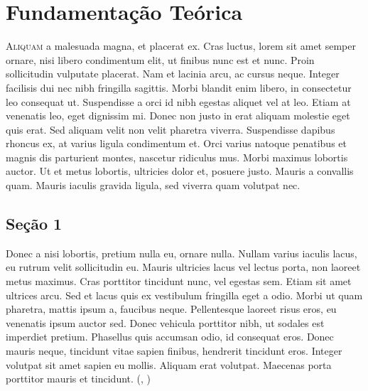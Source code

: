 \chapter{Fundamentação Teórica}
\label{cap:dois}


{\lettrine[loversize=0.25,findent=0.2em,nindent=0em]{A}{liquam} a malesuada magna, et placerat ex. Cras luctus, lorem sit amet semper ornare, nisi libero condimentum elit, ut finibus nunc est et nunc. Proin sollicitudin vulputate placerat. Nam et lacinia arcu, ac cursus neque. Integer facilisis dui nec nibh fringilla sagittis. Morbi blandit enim libero, in consectetur leo consequat ut. Suspendisse a orci id nibh egestas aliquet vel at leo. Etiam at venenatis leo, eget dignissim mi. Donec non justo in erat aliquam molestie eget quis erat. Sed aliquam velit non velit pharetra viverra. Suspendisse dapibus rhoncus ex, at varius ligula condimentum et. Orci varius natoque penatibus et magnis dis parturient montes, nascetur ridiculus mus. Morbi maximus lobortis auctor. Ut et metus lobortis, ultricies dolor et, posuere justo. Mauris a convallis quam. Mauris iaculis gravida ligula, sed viverra quam volutpat nec.

\section{Seção 1}\label{Seção 12}
Donec a nisi lobortis, pretium nulla eu, ornare nulla. Nullam varius iaculis lacus, eu rutrum velit sollicitudin eu. Mauris ultricies lacus vel lectus porta, non laoreet metus maximus. Cras porttitor tincidunt nunc, vel egestas sem. Etiam sit amet ultrices arcu. Sed et lacus quis ex vestibulum fringilla eget a odio. Morbi ut quam pharetra, mattis ipsum a, faucibus neque. Pellentesque laoreet risus eros, eu venenatis ipsum auctor sed. Donec vehicula porttitor nibh, ut sodales est imperdiet pretium. Phasellus quis accumsan odio, id consequat eros. Donec mauris neque, tincidunt vitae sapien finibus, hendrerit tincidunt eros. Integer volutpat sit amet sapien eu mollis. Aliquam erat volutpat. Maecenas porta porttitor mauris et tincidunt. (\citeauthor{smith2014microelectronic}, \citeyear{smith2014microelectronic})

}
